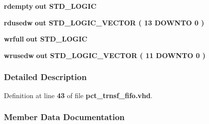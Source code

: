 \begin{DoxyCompactItemize}
\item 
{\bf rdempty}  {\bfseries {\bfseries \textcolor{keywordflow}{out}\textcolor{vhdlchar}{ }}} {\bfseries \textcolor{comment}{S\+T\+D\+\_\+\+L\+O\+G\+IC}\textcolor{vhdlchar}{ }} 
\item 
{\bf rdusedw}  {\bfseries {\bfseries \textcolor{keywordflow}{out}\textcolor{vhdlchar}{ }}} {\bfseries \textcolor{comment}{S\+T\+D\+\_\+\+L\+O\+G\+I\+C\+\_\+\+V\+E\+C\+T\+OR}\textcolor{vhdlchar}{ }\textcolor{vhdlchar}{(}\textcolor{vhdlchar}{ }\textcolor{vhdlchar}{ } \textcolor{vhdldigit}{13} \textcolor{vhdlchar}{ }\textcolor{keywordflow}{D\+O\+W\+N\+TO}\textcolor{vhdlchar}{ }\textcolor{vhdlchar}{ } \textcolor{vhdldigit}{0} \textcolor{vhdlchar}{ }\textcolor{vhdlchar}{)}\textcolor{vhdlchar}{ }} 
\item 
{\bf wrfull}  {\bfseries {\bfseries \textcolor{keywordflow}{out}\textcolor{vhdlchar}{ }}} {\bfseries \textcolor{comment}{S\+T\+D\+\_\+\+L\+O\+G\+IC}\textcolor{vhdlchar}{ }} 
\item 
{\bf wrusedw}  {\bfseries {\bfseries \textcolor{keywordflow}{out}\textcolor{vhdlchar}{ }}} {\bfseries \textcolor{comment}{S\+T\+D\+\_\+\+L\+O\+G\+I\+C\+\_\+\+V\+E\+C\+T\+OR}\textcolor{vhdlchar}{ }\textcolor{vhdlchar}{(}\textcolor{vhdlchar}{ }\textcolor{vhdlchar}{ } \textcolor{vhdldigit}{11} \textcolor{vhdlchar}{ }\textcolor{keywordflow}{D\+O\+W\+N\+TO}\textcolor{vhdlchar}{ }\textcolor{vhdlchar}{ } \textcolor{vhdldigit}{0} \textcolor{vhdlchar}{ }\textcolor{vhdlchar}{)}\textcolor{vhdlchar}{ }} 
\end{DoxyCompactItemize}


\subsubsection{Detailed Description}


Definition at line {\bf 43} of file {\bf pct\+\_\+trnsf\+\_\+fifo.\+vhd}.



\subsubsection{Member Data Documentation}
\paragraph[{ all }]{\hspace{0.3cm}{\ttfamily [Package]}}\label{classpct__trnsf__fifo_a470a86ce8776f637b0483eabf2d92ad2}


